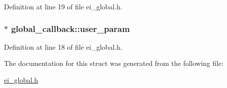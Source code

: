 Definition at line 19 of file ei\_\-global.h.\hypertarget{structglobal__callback_afe70c332da30e95b0e3cdf2ce7230e25}{
\subsubsection[{user\_\-param}]{$\ast$ {\bf global\_\-callback::user\_\-param}}}
\label{structglobal__callback_afe70c332da30e95b0e3cdf2ce7230e25}


Definition at line 18 of file ei\_\-global.h.

The documentation for this struct was generated from the following file:\begin{DoxyCompactItemize}
\item 
\hyperlink{ei__global_8h}{ei\_\-global.h}\end{DoxyCompactItemize}
